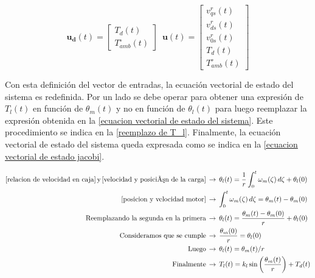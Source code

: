 \documentclass[a4paper, 10pt, onecolumn,journal]{ieeeconf}
\begin{document}
\begin{equation}
    \mathbf{u_{d}}(t) = \begin{bmatrix} T_d(t) \\ T_{amb}^{\circ}(t)\end{bmatrix}\, \, \, 
    \mathbf{u}(t) = \begin{bmatrix} v^r_{qs}(t) \\ v^r_{ds}(t) \\ v^r_{0s}(t) \\ T_d(t) \\ T_{amb}^{\circ}(t) \end{bmatrix}
    \label{vector de entradas jacobi linealizado}
\end{equation}

Con esta definición del vector de entradas, la ecuación vectorial de estado del sistema es redefinida.
Por un lado se debe operar para obtener una expresión de $T_l(t)$ en función de $\theta_m(t)$ y no en función de 
$\theta_l(t)$ para luego reemplazar la expresión obtenida en la \cref{ecuacion vectorial de estado del sistema}.
Este procedimiento se indica en la \cref{reemplazo de T_l}. Finalmente, la ecuación vectorial de estado del sistema queda expresada
como se indica en la \cref{ecuacion vectorial de estado jacobi}.

\begin{equation}
    \begin{aligned}
        \cref{relacion de velocidad en caja} \,\text{y}\, \cref{velocidad y posición de la carga}\,&\rightarrow\,\theta_l(t) = \frac{1}{r} \int_{0}^{t} \omega_m(\zeta) \, d\zeta + \theta_l(0)\\
        \cref{posicion y velocidad motor}\,&\rightarrow\,  \int_{0}^{t} \omega_m(\zeta) \, d\zeta = \theta_m(t) - \theta_m(0)\\
        \text{Reemplazando la segunda en la primera}\,&\rightarrow\,\theta_l(t) = \frac{\theta_m(t) - \theta_m(0)}{r} + \theta_l(0)\\
        \text{Consideramos que se cumple}\,&\rightarrow\,\frac{\theta_m(0)}{r} = \theta_l(0)\\
        \text{Luego}\,&\rightarrow\,\theta_l(t) = \theta_m(t)/r\\
        \text{Finalmente}\,&\rightarrow\,T_l(t) = k_l\sin\left(\frac{\theta_m(t)}{r}\right) + T_d(t)
    \end{aligned}
    \label{reemplazo de T_l}
\end{equation}
\end{document}
